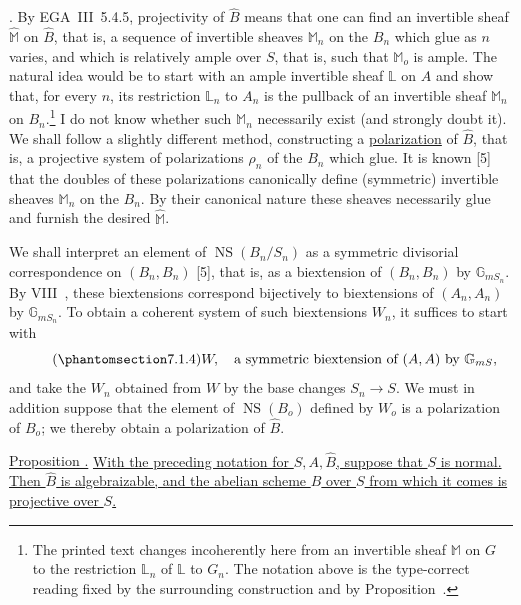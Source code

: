 \medskip
\noindent
{}. By EGA~III~5.4.5, projectivity of $\widehat B$ means that one
can find an invertible sheaf $\widehat{\mathbb M}$ on $\widehat B$,
that is, a sequence of invertible sheaves $\mathbb M_n$ on the $B_n$
which glue as $n$ varies, and which is relatively ample over $S$, that
is, such that $\mathbb M_o$ is ample.  The natural idea would be to
start with an ample invertible sheaf $\mathbb L$ on $A$ and show that,
for every $n$, its restriction $\mathbb L_n$ to $A_n$ is the pullback
of an invertible sheaf $\mathbb M_n$ on $B_n$.\footnote{The printed
text changes incoherently here from an invertible sheaf $\mathbb M$ on
$G$ to the restriction $\mathbb L_n$ of $\mathbb L$ to $G_n$.  The
notation above is the type-correct reading fixed by the surrounding
construction and by Proposition~.}  I do not know whether such
$\mathbb M_n$ necessarily exist (and strongly doubt it).  We shall
follow a slightly different method, constructing a
\underline{polarization} of $\widehat B$, that is, a projective system
of polarizations $\rho_n$ of the $B_n$ which glue.  It is known [5]
that the doubles of these polarizations canonically define
(symmetric) invertible sheaves $\mathbb M_n$ on the $B_n$.  By their
canonical nature these sheaves necessarily glue and furnish the
desired $\widehat{\mathbb M}$.

We shall interpret an element of $\operatorname{NS}(B_n/S_n)$ as a
symmetric divisorial correspondence on $(B_n,B_n)$ [5], that is, as a
biextension of $(B_n,B_n)$ by $\mathbb G_{mS_n}$.  By VIII~, these
biextensions correspond bijectively to biextensions of $(A_n,A_n)$ by
$\mathbb G_{mS_n}$.  To obtain a coherent system of such biextensions
$W_n$, it suffices to start with
\begin{equation}\tag{\SGARefTarget{sga7.sga7i.eix.n7-1-4}{7.1.4}}
 W,\quad\text{a symmetric biextension of $(A,A)$ by $\mathbb G_{mS}$},
\end{equation}
and take the $W_n$ obtained from $W$ by the base changes
$S_n\longrightarrow S$.  We must in addition suppose that the element
of $\operatorname{NS}(B_o)$ defined by $W_o$ is a polarization of
$B_o$; we thereby obtain a polarization of $\widehat B$.

\medskip
\noindent
\underline{Proposition .} \underline{With the preceding notation
for $S,A,\widehat B$, suppose that $S$ is normal.  Then $\widehat B$ is
algebraizable, and the abelian scheme $B$ over $S$ from which it comes
is projective over $S$.}

